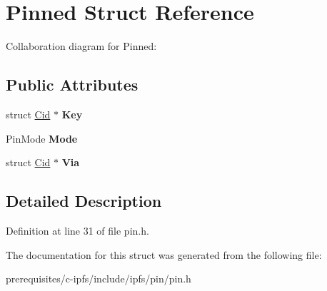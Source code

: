 \hypertarget{struct_pinned}{}\section{Pinned Struct Reference}
\label{struct_pinned}


Collaboration diagram for Pinned\+:
\subsection*{Public Attributes}
\begin{DoxyCompactItemize}
\item 
\mbox{\label{struct_pinned_a7ce671bc0fe45ffb1101a1568a3fdf11}} 
struct \mbox{\hyperlink{struct_cid}{Cid}} $\ast$ {\bfseries Key}
\item 
\mbox{\label{struct_pinned_ad163418a40d097f93a1d0473306b301f}} 
Pin\+Mode {\bfseries Mode}
\item 
\mbox{\label{struct_pinned_ae14eed5f788c6d9c68e1d99f0584de50}} 
struct \mbox{\hyperlink{struct_cid}{Cid}} $\ast$ {\bfseries Via}
\end{DoxyCompactItemize}


\subsection{Detailed Description}


Definition at line 31 of file pin.\+h.



The documentation for this struct was generated from the following file\+:\begin{DoxyCompactItemize}
\item 
prerequisites/c-\/ipfs/include/ipfs/pin/pin.\+h\end{DoxyCompactItemize}
